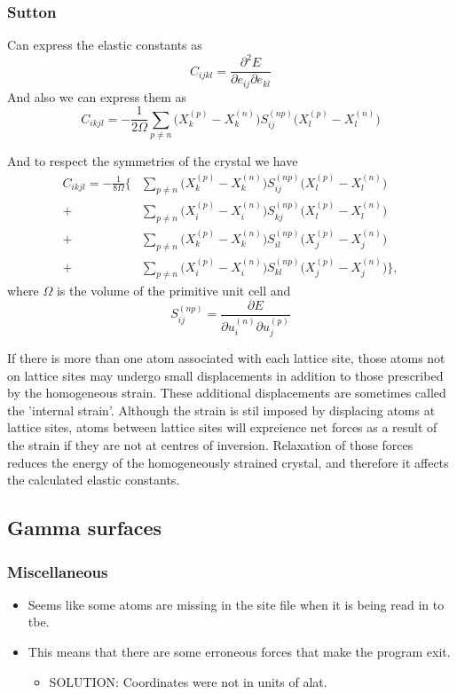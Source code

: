 \documentclass[11pt]{article}
\begin{document}
\subsubsection{Sutton}
\label{sec:orga586d76}
Can express the elastic constants as 
\[ C_{ijkl} = \frac{\partial^2 E}{\partial e_{ij}\partial e_{kl}} \]
And also we can express them as 
\[ C_{ikjl} = -\frac{1}{2\Omega} \sum_{p\neq n} \big( X_k^{(p)} - X_k^{(n)} \big) S_{ij}^{(np)}  \big( X_l^{(p)} - X_l^{(n)}  \big)  \]

And to respect the symmetries of the crystal we have 
\begin{align}
 C_{ikjl} = -\frac{1}{8\Omega}  \Big\{ 
    &\sum_{p\neq n}\big( X_k^{(p)} - X_k^{(n)} \big) S_{ij}^{(np)}  \big( X_l^{(p)} - X_l^{(n)}  \big) \\
  + &\sum_{p\neq n}\big( X_i^{(p)} - X_i^{(n)} \big) S_{kj}^{(np)}  \big( X_l^{(p)} - X_l^{(n)}  \big) \\
  + &\sum_{p\neq n}\big( X_k^{(p)} - X_k^{(n)} \big) S_{il}^{(np)}  \big( X_j^{(p)} - X_j^{(n)}  \big) \\
  + &\sum_{p\neq n}\big( X_i^{(p)} - X_i^{(n)} \big) S_{kl}^{(np)}  \big( X_j^{(p)} - X_j^{(n)}  \big)  \Big\},
\end{align}
where \(\Omega\) is the volume of the primitive unit cell and
\[ S_{ij}^{(np)} =  \frac{\partial E}{\partial u_i^{(n)} \partial u_j^{(p)} } \]

If there is more than one atom associated with each lattice site, 
those atoms not on lattice sites may undergo small displacements in addition to those prescribed by the homogeneous strain.
These additional displacements are sometimes called the 'internal strain'. 
Although the strain is stil imposed by displacing atoms at lattice sites, atoms between lattice sites will expreience 
net forces as a result of the strain if they are not at centres of inversion. 
Relaxation of those forces reduces the energy of the homogeneously strained crystal, and therefore it affects the calculated elastic constants. 



\subsection{Gamma surfaces}
\label{sec:org702798f}
\subsubsection{Miscellaneous}
\label{sec:orgee50b44}
\begin{itemize}
\item Seems like some atoms are missing in the site file when it is being read
in to tbe.
\item This means that there are some erroneous forces that make the program
exit.
\begin{itemize}
\item SOLUTION: Coordinates were not in units of alat.
\end{itemize}
\end{itemize}
\end{document}
